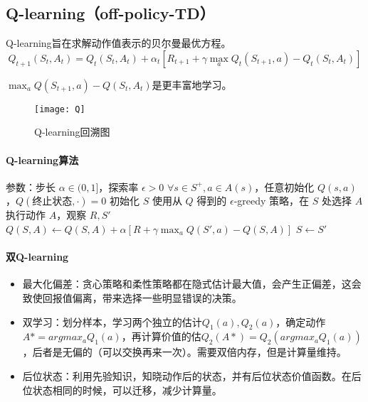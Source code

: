 \documentclass[
12pt, %
a4paper, 
oneside, %
headinclude,footinclude, %
]{scrartcl}
\begin{document}
\subsection{Q-learning（off-policy-TD）}
Q-learning旨在求解动作值表示的贝尔曼最优方程。
$$
Q_{t + 1}(S_t, A_t) = Q_t(S_t, A_t) + \alpha_t[R_{t + 1} + \gamma \max_a Q_t(S_{t + 1}, a) - Q_t(S_t, A_t)]
$$

$ \max_a Q(S_{t + 1}, a) - Q(S_t, A_t) $是更丰富地学习。

\begin{figure}[H]
\centering
\texttt{[image: Q]}
\caption[Q-learning回溯图]{Q-learning回溯图}
\end{figure}
\paragraph{Q-learning算法}
\begin{myalgorithm}[Q-learning 算法]
\State 参数：步长 $\alpha \in (0,1]$，探索率 $\epsilon > 0$
\State $\forall s \in S^+, a \in A(s)$，任意初始化 $Q(s,a)$，$Q(\text{终止状态},\cdot) = 0$
    \State 初始化 $S$
        \State 使用从 $Q$ 得到的 $\epsilon$-greedy 策略，在 $S$ 处选择 $A$
        \State 执行动作 $A$，观察 $R,S'$
        \State $Q(S, A) \gets Q(S, A) + \alpha [R + \gamma \max_a Q(S', a) - Q(S, A)]$
        \State $S \gets S'$
    \EndWhile
\EndFor
\end{myalgorithm}
\paragraph{双Q-learning}
\begin{itemize}
\item 最大化偏差：贪心策略和柔性策略都在隐式估计最大值，会产生正偏差，这会致使回报值偏离，带来选择一些明显错误的决策。
\item 双学习：划分样本，学习两个独立的估计$ Q_1(a),Q_2(a) $，确定动作$ A* = argmax_a Q_1(a) $，再计算价值的估$ Q_2(A*) = Q_2(argmax_a Q_1(a)) $，后者是无偏的（可以交换再来一次）。需要双倍内存，但是计算量维持。
\item 后位状态：利用先验知识，知晓动作后的状态，并有后位状态价值函数。在后位状态相同的时候，可以迁移，减少计算量。
\end{itemize}
\end{document}
